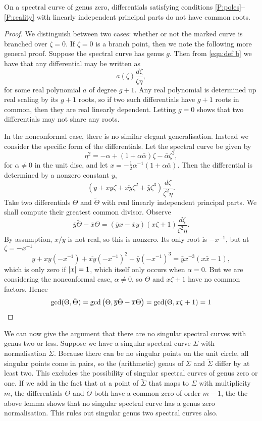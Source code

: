 \documentclass{article}
\begin{document}
\begin{lem}
    \label{lem:no singularities}
On a spectral curve of genus zero, differentials satisfying conditions \ref{P:poles}--\ref{P:reality} with linearly independent principal parts do not have common roots.
\begin{proof}
We distinguish between two cases: whether or not the marked curve is branched over $\zeta=0$. If $\zeta=0$ is a branch point, then we note the following more general proof. Suppose the spectral curve has genus $g$. Then from \eqref{eqn:def b} we have that any differential may be written as
\[
a(\zeta)\frac{d\zeta}{\zeta\eta},
\]
for some real polynomial $a$ of degree $g+1$. Any real polynomial is determined up real scaling by its $g+1$ roots, so if two such differentials have $g+1$ roots in common, then they are real linearly dependent. Letting $g=0$ shows that two differentials may not share any roots.

In the nonconformal case, there is no similar elegant generalisation. Instead we consider the specific form of the differentials. Let the spectral curve be given by
\[
\eta^2 = -\alpha + (1+\alpha\bar{\alpha})\zeta -\bar{\alpha} \zeta^2,
\]
for $\alpha\neq 0$ in the unit disc, and let $x = -\frac{1}{2}\alpha^{-1}(1+\alpha\bar{\alpha})$. Then the differential is determined by a nonzero constant $y$,
\[
(y + xy \zeta + \overline{xy}\zeta^2 + \bar{y}\zeta^3)\frac{d\zeta}{\zeta^2\eta}.
\]
Take two differentials $\Theta$ and $\tilde{\Theta}$ with real linearly independent principal parts. We shall compute their greatest common divisor. Observe
\[
\bar{y}\tilde{\Theta} - \bar{x}\Theta = (\bar{y}x - \bar{x}y)(x\zeta+1)\frac{d\zeta}{\zeta^2\eta}.
\]
By assumption, $x/y$ is not real, so this is nonzero. Its only root is $-x^{-1}$, but at $\zeta=-x^{-1}$
\[
y + xy (-x^{-1}) + \overline{xy}(-x^{-1})^2 + \bar{y}(-x^{-1})^3
= \bar{y}x^{-3} ( x\bar{x} - 1),
\]
which is only zero if $\left|x\right| = 1$, which itself only occurs when $\alpha=0$. But we are considering the nonconformal case, $\alpha\neq 0$, so $\Theta$ and $x\zeta+1$ have no common factors. Hence
\[
\gcd(\Theta,\tilde{\Theta})
= \gcd\left( \Theta, \overline{y}\tilde{\Theta} - \overline{x}\Theta \right)
= \gcd( \Theta, x\zeta+1) = 1
\]
\end{proof}
\end{lem}

We can now give the argument that there are no singular spectral curves with genus two or less.
Suppose we have a singular spectral curve $\Sigma$ with normalisation $\tilde{\Sigma}$.
Because there can be no singular points on the unit circle, all singular points come in pairs, so the (arithmetic) genus of $\Sigma$ and $\tilde{\Sigma}$ differ by at least two. This excludes the possibility of singular spectral curves of genus zero or one. If we add in the fact that at a point of $\tilde{\Sigma}$ that maps to $\Sigma$ with multiplicity $m$, the differentials $\Theta$ and $\tilde{\Theta}$ both have a common zero of order $m-1$, the the above lemma shows that no singular spectral curve has a genus zero normalisation. This rules out singular genus two spectral curves also.
\end{document}
